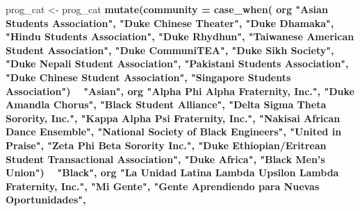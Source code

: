 \documentclass[]{article}
\newenvironment{Shaded}{\begin{snugshade}}{\end{snugshade}}
\newcommand{\DataTypeTok}[1]{\textcolor[rgb]{0.13,0.29,0.53}{#1}}
\newcommand{\KeywordTok}[1]{\textcolor[rgb]{0.13,0.29,0.53}{\textbf{#1}}}
\newcommand{\NormalTok}[1]{#1}
\newcommand{\OperatorTok}[1]{\textcolor[rgb]{0.81,0.36,0.00}{\textbf{#1}}}
\newcommand{\StringTok}[1]{\textcolor[rgb]{0.31,0.60,0.02}{#1}}
\begin{document}
\begin{Shaded}
\begin{Highlighting}[]
\NormalTok{prog_cat <-}\StringTok{ }\NormalTok{prog_cat }\OperatorTok{%
\StringTok{  }\KeywordTok{mutate}\NormalTok{(}\DataTypeTok{community =} \KeywordTok{case_when}\NormalTok{(}
\NormalTok{    org }\OperatorTok{%
              \StringTok{"Asian Students Association"}\NormalTok{,}
              \StringTok{"Duke Chinese Theater"}\NormalTok{,}
              \StringTok{"Duke Dhamaka"}\NormalTok{,}
              \StringTok{"Hindu Students Association"}\NormalTok{,}
              \StringTok{"Duke Rhydhun"}\NormalTok{,}
              \StringTok{"Taiwanese American Student Association"}\NormalTok{,}
              \StringTok{"Duke CommuniTEA"}\NormalTok{,}
              \StringTok{"Duke Sikh Society"}\NormalTok{,}
              \StringTok{"Duke Nepali Student Association"}\NormalTok{,}
              \StringTok{"Pakistani Students Association"}\NormalTok{,}
              \StringTok{"Duke Chinese Student Association"}\NormalTok{,}
              \StringTok{"Singapore Students Association"}\NormalTok{) }\OperatorTok{~}\StringTok{ "Asian"}\NormalTok{,}
\NormalTok{    org }\OperatorTok{%
              \StringTok{"Alpha Phi Alpha Fraternity, Inc."}\NormalTok{,}
              \StringTok{"Duke Amandla Chorus"}\NormalTok{,}
              \StringTok{"Black Student Alliance"}\NormalTok{,}
              \StringTok{"Delta Sigma Theta Sorority, Inc."}\NormalTok{,}
              \StringTok{"Kappa Alpha Psi Fraternity, Inc."}\NormalTok{,}
              \StringTok{"Nakisai African Dance Ensemble"}\NormalTok{,}
              \StringTok{"National Society of Black Engineers"}\NormalTok{,}
              \StringTok{"United in Praise"}\NormalTok{,}
              \StringTok{"Zeta Phi Beta Sorority Inc."}\NormalTok{,}
              \StringTok{"Duke Ethiopian/Eritrean Student Transactional Association"}\NormalTok{,}
              \StringTok{"Duke Africa"}\NormalTok{,}
              \StringTok{"Black Men's Union"}\NormalTok{) }\OperatorTok{~}\StringTok{ "Black"}\NormalTok{,}
\NormalTok{    org }\OperatorTok{%
              \StringTok{"La Unidad Latina Lambda Upsilon Lambda Fraternity, Inc."}\NormalTok{,}
              \StringTok{"Mi Gente"}\NormalTok{,}
              \StringTok{"Gente Aprendiendo para Nuevas Oportunidades"}\NormalTok{,}
}}}}
\end{Highlighting}
\end{Shaded}
\end{document}
